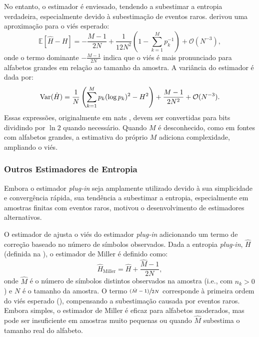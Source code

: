 No entanto, o estimador é enviesado, tendendo a subestimar a entropia
verdadeira, especialmente devido à subestimação de eventos raros. 
\textcite{harris1975} derivou uma aproximação para o viés esperado:
\begin{equation}
\mathbb{E}[\hat{H} - H] = -\frac{M - 1}{2N} + \frac{1}{12 N^2} \left( 1 - \sum_{k=1}^M p_k^{-1} \right) + \mathcal{O}(N^{-3}),
\label{eq:biasHplugin}
\end{equation}
onde o termo dominante $-\frac{M - 1}{2N}$ indica que o viés é mais pronunciado
para alfabetos grandes em relação ao tamanho da amostra. 
A variância do estimador é dada por:
\begin{equation}
\Var(\hat{H}) = \frac{1}{N} \left( \sum_{k=1}^M p_k (\log p_k)^2 - H^2 \right) + \frac{M - 1}{2 N^2} + \mathcal{O}(N^{-3}).
\label{eq:variance}
\end{equation}
Essas expressões, originalmente em nats \parencite{harris1975}, devem ser convertidas 
para bits dividindo por $\ln 2$ quando necessário. Quando $M$ é desconhecido, 
como em fontes com alfabetos grandes, a estimativa do próprio $M$ adiciona 
complexidade, ampliando o viés.


\subsubsection{Outros Estimadores de Entropia}
\label{subsec:outros-estimadores}

Embora o estimador \textit{plug-in} seja amplamente utilizado devido à sua
simplicidade e convergência rápida, sua tendência a subestimar
a entropia, especialmente em amostras finitas com eventos raros, motivou o
desenvolvimento de estimadores alternativos. 

O estimador de \cite{miller1955} ajusta o viés do estimador
\textit{plug-in} adicionando um termo de correção baseado no número de símbolos
observados. Dada a entropia \textit{plug-in}, $\hat{H}$ (definida na ), 
o estimador de Miller é definido como:
\begin{equation}
\hat{H}_{\text{Miller}} = \hat{H} + \frac{\hat{M} - 1}{2N},
\label{eq:miller}
\end{equation}
onde $\hat{M}$ é o número de símbolos distintos observados na amostra 
(i.e., com $n_k > 0$) e $N$ é o tamanho da amostra. 
O termo $\sfrac{(\hat{M} - 1)}{2N}$ corresponde à primeira ordem do viés esperado 
(), compensando a subestimação causada por eventos raros. 
Embora simples, o estimador de Miller é eficaz para alfabetos moderados, 
mas pode ser insuficiente em amostras muito pequenas ou quando $\hat{M}$
subestima o tamanho real do alfabeto.


